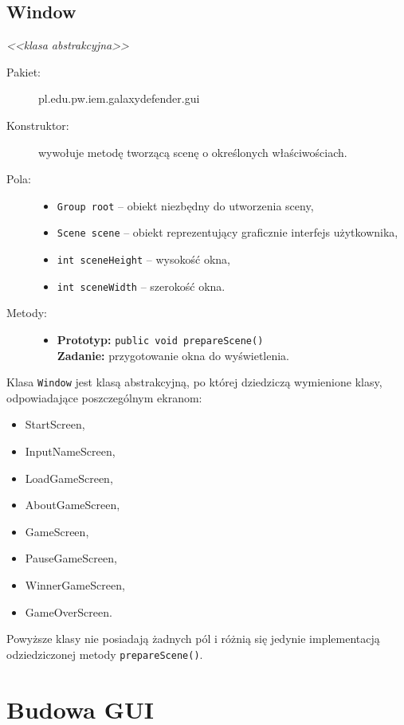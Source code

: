 \documentclass[a4paper]{article}
\newcommand{\prog}{\texttt}
\begin{document}
\subsection{Window}
\textit{<<klasa abstrakcyjna>>}
\begin{description}
    \item[Pakiet:] pl.edu.pw.iem.galaxydefender.gui
    \item[Konstruktor:] wywołuje metodę tworzącą scenę o określonych właściwościach.
    \item[Pola:] \hfill
    \begin{itemize}
        \item \prog{Group root} -- obiekt niezbędny do utworzenia sceny,
        \item \prog{Scene scene} -- obiekt reprezentujący graficznie interfejs użytkownika,
        \item \prog{int sceneHeight} -- wysokość okna,
        \item \prog{int sceneWidth} -- szerokość okna.
    \end{itemize}
    \item[Metody:] \hfill
    \begin{itemize}
        \item \textbf{Prototyp:} \prog{public void prepareScene()}\\\textbf{Zadanie:} przygotowanie okna do wyświetlenia.
    \end{itemize}
\end{description}

Klasa \prog{Window} jest klasą abstrakcyjną, po której dziedziczą wymienione klasy, odpowiadające poszczególnym ekranom:
\begin{itemize}
    \item{StartScreen},
    \item{InputNameScreen},
    \item{LoadGameScreen},
    \item{AboutGameScreen},
    \item{GameScreen},
    \item{PauseGameScreen},
    \item{WinnerGameScreen},
    \item{GameOverScreen}.
\end{itemize}
Powyższe klasy nie posiadają żadnych pól i różnią się jedynie implementacją odziedziczonej metody \prog{prepareScene()}.

\section{Budowa GUI}
\end{document}
